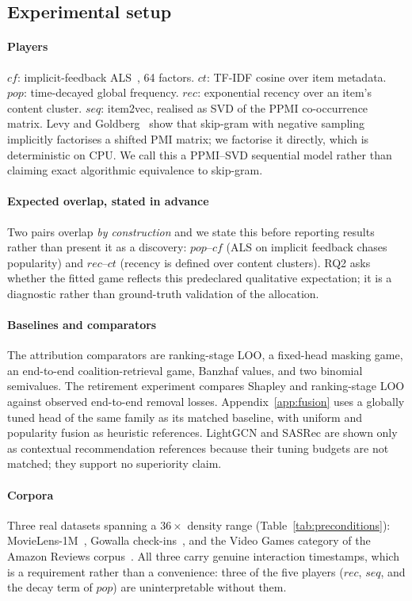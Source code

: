 \documentclass[pdflatex,sn-basic,Numbered]{sn-jnl}
\theoremstyle{plain}
\theoremstyle{definition}
\begin{document}
\subsection{Experimental setup}\label{sec:setup}

\paragraph{Players}
$cf$: implicit-feedback ALS~\citep{hu2008collaborative}, 64 factors. $ct$: TF-IDF cosine over item
metadata. $pop$: time-decayed global frequency. $rec$: exponential recency over
an item's content cluster. $seq$: item2vec, realised as SVD of the PPMI
co-occurrence matrix. Levy and Goldberg~\citep{levy2014neural} show that
skip-gram with negative sampling implicitly factorises a shifted PMI matrix; we
factorise it directly, which is deterministic on CPU. We call this a
PPMI--SVD sequential model rather than claiming exact algorithmic
equivalence to skip-gram.

\paragraph{Expected overlap, stated in advance}
Two pairs overlap \emph{by construction} and we state this before reporting
results rather than present it as a discovery: $pop$--$cf$ (ALS on implicit feedback chases
popularity) and $rec$--$ct$ (recency is defined over content clusters). RQ2
asks whether the fitted game reflects this predeclared qualitative expectation;
it is a diagnostic rather than ground-truth validation of the allocation.

\paragraph{Baselines and comparators}
The attribution comparators are ranking-stage LOO, a fixed-head masking game,
an end-to-end coalition-retrieval game, Banzhaf values, and two binomial
semivalues. The retirement experiment compares Shapley and ranking-stage LOO
against observed end-to-end removal losses. Appendix~\ref{app:fusion} uses a
globally tuned head of the same family as its matched baseline, with uniform and
popularity fusion as heuristic references. LightGCN and SASRec are shown only as
contextual recommendation references because their tuning budgets are not
matched; they support no superiority claim.

\paragraph{Corpora}
Three real datasets spanning a $36\times$ density range
(Table~\ref{tab:preconditions}): MovieLens-1M~\citep{harper2015movielens},
Gowalla check-ins~\citep{cho2011friendship}, and the Video Games category of
the Amazon Reviews corpus~\citep{hou2026bridging,ni2019justifying}. All three carry genuine
interaction timestamps, which is a requirement rather than a convenience: three
of the five players ($rec$, $seq$, and the decay term of $pop$) are
uninterpretable without them.
\end{document}
